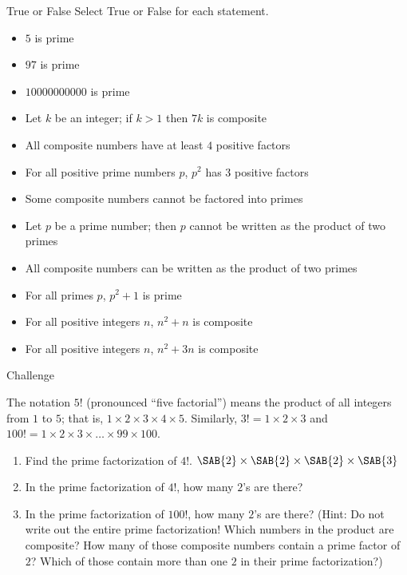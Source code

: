 \documentclass[12pt,letterpaper]{article}
\begin{document}
\begin{problem}{True or False}
Select True or False for each statement.

\begin{itemize}
  \item $5$ is prime \hfill \TFTrue
  \item $97$ is prime \hfill \TFTrue
  \item $10000000000$ is prime \hfill \TFFalse
  \item Let \(k\) be an integer; if \(k>1\) then $7k$ is composite \hfill
  \TFTrue
  \item All composite numbers have at least \(4\) positive factors
  \hfill \TFFalse
  \item For all positive prime numbers \(p\), \(p^2\) has \(3\) positive factors
  \hfill \TFTrue
  \item Some composite numbers cannot be factored into primes
  \hfill \TFFalse
  \item Let \(p\) be a prime number; then \(p\) cannot be written as the
  product of two primes \hfill \TFTrue
  \item All composite numbers can be written as the product of two primes
  \hfill \TFFalse
  \item For all primes \(p\), \(p^2 + 1\) is prime \hfill \TFFalse
  \item For all positive integers \(n\), \(n^2 + n\) is composite \hfill
  \TFFalse
  \item For all positive integers \(n\), \(n^2 + 3n\) is composite \hfill
  \TFTrue
 \end{itemize}

\end{problem}

\begin{problem}{Challenge}

The notation $5!$ (pronounced ``five factorial'') means the product of all
integers from $1$ to $5$; that is, $1 \times 2 \times 3 \times 4 \times 5$.
Similarly, $3! = 1 \times 2 \times 3$ and $100! = 1 \times 2 \times 3
\times\dots\times 99 \times 100$.

\begin{enumerate}
 \item Find the prime factorization of $4!$. \hfill
 $\SAB{2} \times \SAB{2} \times \SAB{2} \times \SAB{3}$
 \item In the prime factorization of $4!$, how many $2$'s are there?
 \item In the prime factorization of $100!$, how many $2$'s are there? (Hint: Do
 not write out the entire prime factorization! Which numbers in the product are
 composite? How many of those composite numbers contain a prime factor of $2$?
 Which of those contain more than one $2$ in their prime factorization?)
\end{enumerate}

\end{problem}
\end{document}
